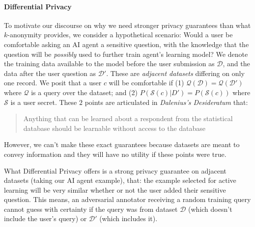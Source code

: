\documentclass[letterpaper]{article}
\begin{document}

\paragraph{Differential Privacy}

To motivate our discourse on why we need stronger privacy guarantees than what $k$-anonymity provides, we consider a hypothetical scenario: Would a user be comfortable asking an AI agent a sensitive question, with the knowledge that the question will be \textit{possibly} used to further train agent's learning model? We denote the training data available to the model before the user submission as $\mathcal{D}$, and the data after the user question as $\mathcal{D}'$. These are \textit{adjacent datasets} differing on only one record. We posit that a user $c$ will be comfortable if (1) $\mathcal{Q(D)} = \mathcal{Q(D')}$ where $\mathcal{Q}$ is a query over the dataset; and (2) $P(\mathcal{S}(c)|D') = P(\mathcal{S}(c))$ where $\mathcal{S}$ is a user secret. These $2$ points are articulated in \textit{Dalenius's Desideratum} \cite{dwork2011firm} that: \begin{quote} Anything that can be learned about a respondent from the statistical database should be learnable without access to the database \end{quote}

\noindent However, we can't make these exact guarantees because datasets are meant to convey information and they will have no utility if these points were true.

What Differential Privacy \cite{dwork2011firm,dwork2014algorithmic} offers is a strong privacy guarantee on adjacent datasets (taking our AI agent example), that: the example selected for active learning will be very similar whether or not the user added their sensitive question. This means, an adversarial annotator receiving a random training query cannot guess with certainty if the query was from dataset $\mathcal{D}$ (which doesn't include the user's query) or $\mathcal{D}'$ (which includes it). 

\end{document}
